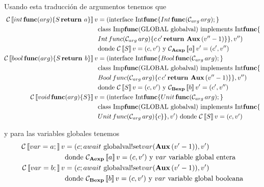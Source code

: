 Usando esta traducción de argumentos tenemos que
\begin{align*}
  \mathcal{C}\left\llbracket int\,\textbf{func}(arg)\{S\,\textbf{return } a\} \right\rrbracket v &= (\mbox{interface Int$\textbf{func}$}\{
  \mbox{$Int\, \textbf{func}(\mathcal{C}_{arg}\,arg)\mbox{;\,}$}\}\\
  & \mbox{class Imp$\textbf{func}($GLOBAL globalval$)$ implements Int$\textbf{func}\{$}\\
  & Int\, func(\mathcal{C}_{arg}\,arg) \{ c\,c'\,\textbf{return } \textbf{Aux}\, (v'' - 1)\}\} , v'')\\
  & \mbox{donde $\mathcal{C}\left\llbracket S \right\rrbracket v = (c, v')$ y } \mathcal{C}_{\textbf{Aexp}}\left\llbracket a \right\rrbracket v' = (c', v'')\\
  \mathcal{C}\left\llbracket bool\,\textbf{func}(arg)\{S\,\textbf{return } b\} \right\rrbracket v &= (\mbox{interface Int$\textbf{func}$}\{
  \mbox{$Bool\, \textbf{func}(\mathcal{C}_{arg}\,arg)\mbox{;\,}$}\}\\
  & \mbox{class Imp$\textbf{func}($GLOBAL globalval$)$ implements Int$\textbf{func}\{$}\\
  & Bool\, func(\mathcal{C}_{arg}\,arg) \{ c\,c'\,\textbf{return } \textbf{Aux}\, (v'' - 1)\}\} , v'')\\
  & \mbox{donde $\mathcal{C}\left\llbracket S \right\rrbracket v = (c, v')$ y } \mathcal{C}_{\textbf{Bexp}}\left\llbracket b \right\rrbracket v' = (c', v'')\\
  \mathcal{C}\left\llbracket void\,\textbf{func}(arg)\{S\} \right\rrbracket v &= (\mbox{interface Int$\textbf{func}$}\{
  \mbox{$Unit\, \textbf{func}(\mathcal{C}_{arg}\,arg)\mbox{;\,}$}\}\\
  & \mbox{class Imp$\textbf{func}($GLOBAL globalval$)$ implements Int$\textbf{func}\{$}\\
  & Unit\, func(\mathcal{C}_{arg}\,arg) \{ c \}\} , v')
  \mbox{ donde $\mathcal{C}\left\llbracket S \right\rrbracket v = (c, v')$}
\end{align*}

y para las variables globales tenemos
\begin{align*} %
  \C\eval{var = a\;} v &= (c\; await \mbox{ globalval!set}var(\Aux\, (v' - 1)), v') \\
  & \mbox{donde $\C_\AExp\eval{a} v = (c, v')$ y $var$ variable global entera} \\
  \C\eval{var = b\;} v &= (c\; await \mbox{ globalval!set}var(\Aux\, (v' - 1)), v') \\
  & \mbox{donde $\C_\BExp\eval{b} v = (c, v')$ y $var$ variable global booleana}
\end{align*}
